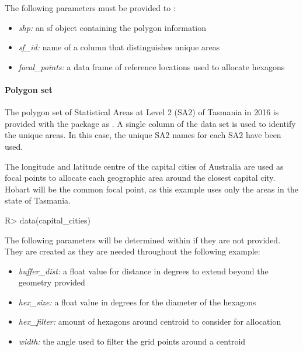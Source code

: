 \documentclass[
]{jss}
\providecommand{\tightlist}{%
  \setlength{\itemsep}{0pt}\setlength{\parskip}{0pt}}
\begin{document}
The following parameters must be provided to :

\begin{itemize}
\tightlist
\item
  \emph{shp:} an sf object containing the polygon information
\item
  \emph{sf\_id:} name of a column that distinguishes unique areas
\item
  \emph{focal\_points:} a data frame of reference locations used to
  allocate hexagons
\end{itemize}

\hypertarget{polygon-set}{%
\paragraph{Polygon set}\label{polygon-set}}

The polygon set of Statistical Areas at Level 2 (SA2) \citep{abs2016} of
Tasmania in 2016 is provided with the  package as
. A single column of the data set is used to identify the
unique areas. In this case, the unique SA2 names for each SA2 have been
used.

The longitude and latitude centre of the capital cities of Australia are
used as focal points to allocate each geographic area around the closest
capital city. Hobart will be the common focal point, as this example
uses only the areas in the state of Tasmania.

\begin{CodeChunk}

\begin{CodeInput}
R> data(capital_cities)
\end{CodeInput}
\end{CodeChunk}

The following parameters will be determined within 
if they are not provided. They are created as they are needed throughout
the following example:

\begin{itemize}
\tightlist
\item
  \emph{buffer\_dist:} a float value for distance in degrees to extend
  beyond the geometry provided
\item
  \emph{hex\_size:} a float value in degrees for the diameter of the
  hexagons
\item
  \emph{hex\_filter:} amount of hexagons around centroid to consider for
  allocation
\item
  \emph{width:} the angle used to filter the grid points around a
  centroid
\end{itemize}
\end{document}
